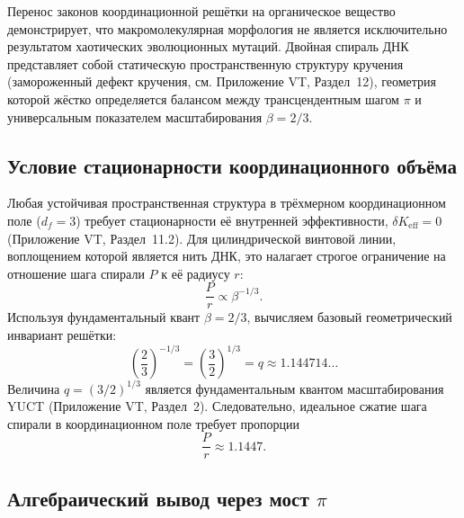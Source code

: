 \documentclass[12pt,a4paper]{article}
\newcommand{\Keff}{K_{\mathrm{eff}}}
\newcommand{\df}{d_{\!f}}  %
\begin{document}
	Перенос законов координационной решётки на органическое вещество демонстрирует, что макромолекулярная морфология не является исключительно результатом хаотических эволюционных мутаций. Двойная спираль ДНК представляет собой статическую пространственную структуру кручения (замороженный дефект кручения, см. Приложение VT, Раздел~12), геометрия которой жёстко определяется балансом между трансцендентным шагом $\pi$ и универсальным показателем масштабирования $\beta = 2/3$.
	
	\subsection{Условие стационарности координационного объёма}
	
	Любая устойчивая пространственная структура в трёхмерном координационном поле ($\df=3$) требует стационарности её внутренней эффективности, $\delta\Keff = 0$ (Приложение VT, Раздел~11.2). Для цилиндрической винтовой линии, воплощением которой является нить ДНК, это налагает строгое ограничение на отношение шага спирали $P$ к её радиусу $r$:
	\begin{equation}
		\frac{P}{r} \propto \beta^{-1/3}.
		\label{eq:dna-pr}
	\end{equation}
	Используя фундаментальный квант $\beta = 2/3$, вычисляем базовый геометрический инвариант решётки:
	\begin{equation}
		\left(\frac{2}{3}\right)^{-1/3} = \left(\frac{3}{2}\right)^{1/3} = q \approx 1.144714\ldots
		\label{eq:q-def}
	\end{equation}
	Величина $q = (3/2)^{1/3}$ является фундаментальным квантом масштабирования YUCT (Приложение VT, Раздел~2). Следовательно, идеальное сжатие шага спирали в координационном поле требует пропорции
	\begin{equation}
		\frac{P}{r} \approx 1.1447.
		\label{eq:pr-ideal}
	\end{equation}
	
	\subsection{Алгебраический вывод через мост $\pi$}
	
\end{document}
